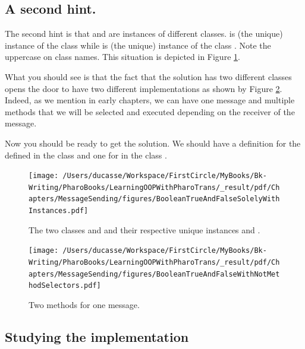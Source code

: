 \documentclass[10pt,twoside,english]{_support/latex/sbabook/sbabook}
\begin{document}
\subsection{A second hint.}
The second hint is that  and  are instances of different classes.  is (the unique) instance of the class  while  is (the unique) instance of the class . Note the uppercase on class names. This situation is depicted in Figure \ref{figTrueFalseOnly}.

What you should see is that the fact that the solution has two different classes opens the door to have two different  implementations as shown by Figure \ref{figTrueFalseOnlySelectors}. Indeed, as we mention in early chapters, we can have one message and multiple methods that we will be selected and executed depending on the receiver of the message. 

Now you should be ready to get the solution. We should have a definition for the  defined in the class  and one for  in the class .


\begin{figure}

\begin{center}
\texttt{[image: /Users/ducasse/Workspace/FirstCircle/MyBooks/Bk-Writing/PharoBooks/LearningOOPWithPharoTrans/\_result/pdf/Chapters/MessageSending/figures/BooleanTrueAndFalseSolelyWithInstances.pdf]}\caption{The two classes  and  and their respective unique instances  and .\label{figTrueFalseOnly}}\end{center}
\end{figure}



\begin{figure}

\begin{center}
\texttt{[image: /Users/ducasse/Workspace/FirstCircle/MyBooks/Bk-Writing/PharoBooks/LearningOOPWithPharoTrans/\_result/pdf/Chapters/MessageSending/figures/BooleanTrueAndFalseWithNotMethodSelectors.pdf]}\caption{Two methods for one message.\label{figTrueFalseOnlySelectors}}\end{center}
\end{figure}

\subsection{Studying the implementation}
\end{document}
